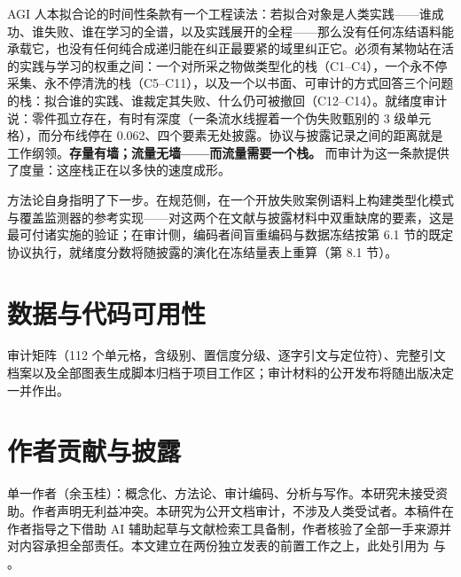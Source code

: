 \documentclass[10pt,fontset=fandol]{ctexart}
\begin{document}
AGI 人本拟合论的时间性条款有一个工程读法：若拟合对象是人类实践——谁成功、谁失败、谁在学习的全谱，以及实践展开的全程——那么没有任何冻结语料能承载它，也没有任何纯合成递归能在纠正最要紧的域里纠正它。必须有某物站在活的实践与学习的权重之间：一个对所采之物做类型化的栈（C1--C4），一个永不停采集、永不停清洗的栈（C5--C11），以及一个以书面、可审计的方式回答三个问题的栈：拟合谁的实践、谁裁定其失败、什么仍可被撤回（C12--C14）。就绪度审计说：零件孤立存在，有时有深度（一条流水线握着一个伪失败甄别的 3 级单元格），而分布线停在 0.062、四个要素无处披露。协议与披露记录之间的距离就是工作纲领。\textbf{存量有墙；流量无墙——而流量需要一个栈。} 而审计为这一条款提供了度量：这座栈正在以多快的速度成形。

方法论自身指明了下一步。在规范侧，在一个开放失败案例语料上构建类型化模式与覆盖监测器的参考实现——对这两个在文献与披露材料中双重缺席的要素，这是最可付诸实施的验证；在审计侧，编码者间盲重编码与数据冻结按第 6.1 节的既定协议执行，就绪度分数将随披露的演化在冻结量表上重算（第 8.1 节）。

\section*{数据与代码可用性}

审计矩阵（112 个单元格，含级别、置信度分级、逐字引文与定位符）、完整引文档案以及全部图表生成脚本归档于项目工作区；审计材料的公开发布将随出版决定一并作出。

\section*{作者贡献与披露}

单一作者（余玉桂）：概念化、方法论、审计编码、分析与写作。本研究未接受资助。作者声明无利益冲突。本研究为公开文档审计，不涉及人类受试者。本稿件在作者指导之下借助 AI 辅助起草与文献检索工具备制，作者核验了全部一手来源并对内容承担全部责任。本文建立在两份独立发表的前置工作之上，此处引用为 \cite{ref5} 与 \cite{ref6}。



\end{document}
